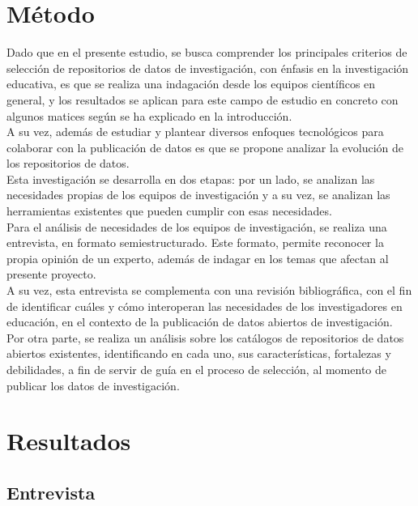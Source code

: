 \documentclass{article}
\begin{document}
\section{Método}

Dado que en el presente estudio, se busca comprender los principales criterios de selección de repositorios de datos de investigación, con énfasis en la investigación educativa, es que se realiza una indagación desde los equipos científicos en general, y los resultados se aplican para este campo de estudio en concreto con algunos matices según se ha explicado en la introducción.\\

A su vez, además de estudiar y plantear diversos enfoques tecnológicos para colaborar con la publicación de datos es que se propone analizar la evolución de los repositorios de datos.\\

Esta investigación se desarrolla en dos etapas: por un lado, se analizan las necesidades propias de los equipos de investigación y a su vez, se analizan las herramientas existentes que pueden cumplir con esas necesidades.\\

Para el análisis de necesidades de los equipos de investigación, se realiza una entrevista, en formato semiestructurado. Este formato, permite reconocer la propia opinión de un experto, además de indagar en los temas que afectan al presente proyecto.\\

A su vez, esta entrevista se complementa con una revisión bibliográfica, con el fin de identificar cuáles y cómo interoperan las necesidades de los investigadores en educación, en el contexto de la publicación de datos abiertos de investigación.\\

Por otra parte, se realiza un análisis sobre los catálogos de repositorios de datos abiertos existentes, identificando en cada uno, sus características, fortalezas y debilidades, a fin de servir de guía en el proceso de selección, al momento de publicar los datos de investigación.\\

\section{Resultados}

\subsection{Entrevista}
\end{document}
